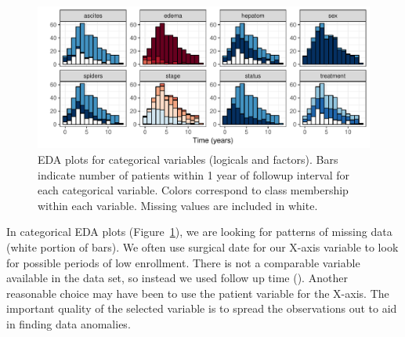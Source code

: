 \documentclass[nojss]{jss}
\begin{document}
\begin{Schunk}
\begin{figure}[!htb]

{\centering \includegraphics[width=\maxwidth]{fig-rfs/rfs-categoricalEDA-1} 

}

\caption[EDA plots for categorical variables (logicals and factors)]{EDA plots for categorical variables (logicals and factors). Bars indicate number of patients within 1 year of followup interval for each categorical variable. Colors correspond to class membership within each variable. Missing values are included in white.}\label{fig:categoricalEDA}
\end{figure}
\end{Schunk}

In categorical EDA plots (Figure~\ref{fig:categoricalEDA}), we are looking for patterns of missing data (white portion of bars). We often use surgical date for our X-axis variable to look for possible periods of low enrollment. There is not a comparable variable available in the  data set, so instead we used follow up time (). Another reasonable choice may have been to use the patient  variable for the X-axis. The important quality of the selected variable is to spread the observations out to aid in finding data anomalies.
\end{document}
